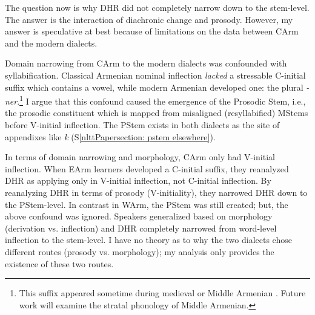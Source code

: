 The question now is why DHR did not completely narrow down to the stem-level. The answer is the interaction of diachronic change and prosody. However, my answer is speculative at best because of limitations on the data between CArm and the modern dialects. 

Domain narrowing from CArm to the modern dialects was confounded with syllabification. Classical Armenian nominal inflection \textit{lacked} a stressable C-initial suffix which contains a vowel, while modern Armenian developed one: the plural \textit{-ner}.\footnote{This suffix appeared sometime during medieval or Middle Armenian \citep{Karst-1901-MiddleArmenain}. Future work will examine the stratal phonology of Middle Armenian.} I argue that this confound caused the emergence of the Prosodic Stem, i.e., the prosodic constituent which is mapped from misaligned (resyllabified) MStems before V-initial inflection. The PStem exists in both dialects as the site of appendixes like \textit{k} (S\ref{nlttPapersection: pstem elsewhere}).

In terms of domain narrowing and morphology, CArm only had V-initial inflection. When EArm learners developed a C-initial suffix, they reanalyzed DHR as applying only in V-initial inflection, not C-initial inflection. By reanalyzing DHR in terms of prosody (V-initiality), they narrowed DHR down to the PStem-level. In contrast in WArm, the PStem was still created; but, the above confound was ignored. Speakers generalized based on morphology (derivation vs. inflection) and DHR completely narrowed from word-level inflection to the stem-level. I have no theory as to why the two dialects chose different routes (prosody vs. morphology); my analysis only provides the existence of these two routes. 








